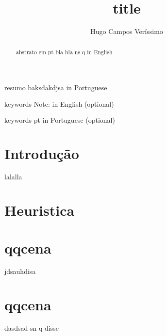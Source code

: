 \documentclass[mirror]{revdetua}
\begin{document}

\title{title}
\author{Hugo Campos Veríssimo}
\maketitle

\begin{abstract}
abstrato em pt bla bla ns q in English
\end{abstract}

\begin{resumo}
resumo baksdakdjsa in Portuguese
\end{resumo}

\begin{keywords}
keywords Note: in English (optional)
\end{keywords}

\begin{palavraschave}
keywords pt in Portuguese (optional)
\end{palavraschave}

\section{Introdução}
lalalla

\section{Heuristica}

\section{qqcena}

jdsauhdisa \cite{Nobody06}

\section{qqcena}
dasdsad sn q disse \cite{Nobody06}

\end{document}
